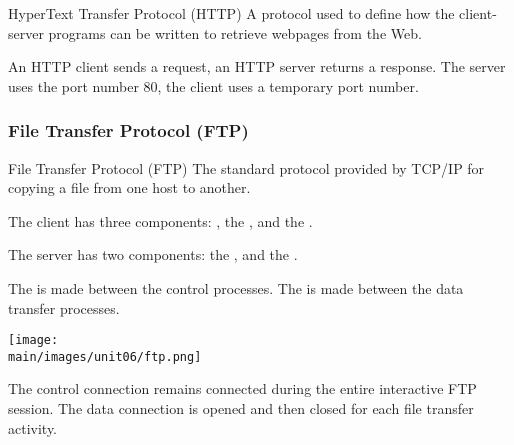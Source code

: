 \documentclass[\main/notes.tex]{subfiles}
\begin{document}
					\begin{definition}{HyperText Transfer Protocol (HTTP)}
						A protocol used to define how the client-server programs can be written to retrieve webpages from the Web.

						An HTTP client sends a request, an HTTP server returns a response. The server uses the port number $80$, the client uses a temporary port number.
					\end{definition}
				\pagebreak
				\subsubsection{File Transfer Protocol (FTP)}
					\begin{definition}{File Transfer Protocol (FTP)}
						The standard protocol provided by TCP/IP for copying a file from one host to another.

						The client has three components: , the , and the .

						The server has two components: the , and the .

						The  is made between the control processes. The  is made between the data transfer processes.

						\begin{center}
							\texttt{[image: \\main/images/unit06/ftp.png]}
						\end{center}

						The control connection remains connected during the entire interactive FTP session. The data connection is opened and then closed for each file transfer activity.
					\end{definition}
\end{document}
